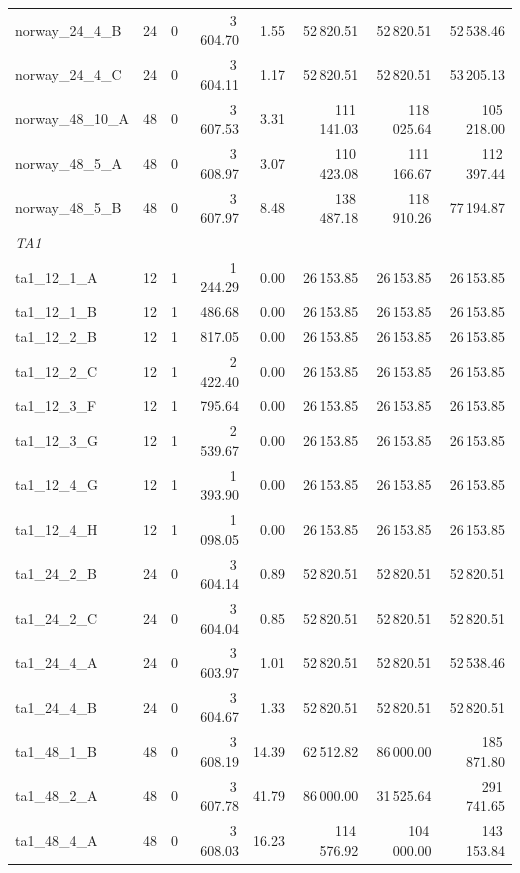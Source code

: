 \documentclass{article}
\begin{document}
\begin{table}[h!]
\begin{tabular}{@{}l r c r r r r r@{}}
norway\_24\_4\_B & 24 & 0 & 3\,604.70 & 1.55 & 52\,820.51 & 52\,820.51 & 52\,538.46 \\
norway\_24\_4\_C & 24 & 0 & 3\,604.11 & 1.17 & 52\,820.51 & 52\,820.51 & 53\,205.13 \\
norway\_48\_10\_A & 48 & 0 & 3\,607.53 & 3.31 & 111\,141.03 & 118\,025.64 & 105\,218.00 \\
norway\_48\_5\_A & 48 & 0 & 3\,608.97 & 3.07 & 110\,423.08 & 111\,166.67 & 112\,397.44 \\
norway\_48\_5\_B & 48 & 0 & 3\,607.97 & 8.48 & 138\,487.18 & 118\,910.26 & 77\,194.87 \\
\midrule
\multicolumn{8}{l}{\textit{TA1}} \\
\midrule
ta1\_12\_1\_A & 12 & 1 & 1\,244.29 & 0.00 & 26\,153.85 & 26\,153.85 & 26\,153.85 \\
ta1\_12\_1\_B & 12 & 1 & 486.68 & 0.00 & 26\,153.85 & 26\,153.85 & 26\,153.85 \\
ta1\_12\_2\_B & 12 & 1 & 817.05 & 0.00 & 26\,153.85 & 26\,153.85 & 26\,153.85 \\
ta1\_12\_2\_C & 12 & 1 & 2\,422.40 & 0.00 & 26\,153.85 & 26\,153.85 & 26\,153.85 \\
ta1\_12\_3\_F & 12 & 1 & 795.64 & 0.00 & 26\,153.85 & 26\,153.85 & 26\,153.85 \\
ta1\_12\_3\_G & 12 & 1 & 2\,539.67 & 0.00 & 26\,153.85 & 26\,153.85 & 26\,153.85 \\
ta1\_12\_4\_G & 12 & 1 & 1\,393.90 & 0.00 & 26\,153.85 & 26\,153.85 & 26\,153.85 \\
ta1\_12\_4\_H & 12 & 1 & 1\,098.05 & 0.00 & 26\,153.85 & 26\,153.85 & 26\,153.85 \\
ta1\_24\_2\_B & 24 & 0 & 3\,604.14 & 0.89 & 52\,820.51 & 52\,820.51 & 52\,820.51 \\
ta1\_24\_2\_C & 24 & 0 & 3\,604.04 & 0.85 & 52\,820.51 & 52\,820.51 & 52\,820.51 \\
ta1\_24\_4\_A & 24 & 0 & 3\,603.97 & 1.01 & 52\,820.51 & 52\,820.51 & 52\,538.46 \\
ta1\_24\_4\_B & 24 & 0 & 3\,604.67 & 1.33 & 52\,820.51 & 52\,820.51 & 52\,820.51 \\
ta1\_48\_1\_B & 48 & 0 & 3\,608.19 & 14.39 & 62\,512.82 & 86\,000.00 & 185\,871.80 \\
ta1\_48\_2\_A & 48 & 0 & 3\,607.78 & 41.79 & 86\,000.00 & 31\,525.64 & 291\,741.65 \\
ta1\_48\_4\_A & 48 & 0 & 3\,608.03 & 16.23 & 114\,576.92 & 104\,000.00 & 143\,153.84 \\
\bottomrule
\end{tabular}
\end{table}
\end{document}
